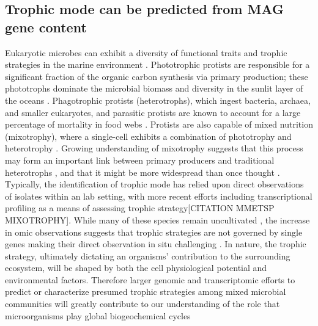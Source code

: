 \documentclass[12pt]{article}
\numberwithin{equation}{section}
\begin{document}
\subsection*{Trophic mode can be predicted from MAG gene content}

Eukaryotic microbes can exhibit a diversity of functional traits and trophic strategies in the marine environment \citep{Worden2015} \citep{Caron2011Marine}. Phototrophic protists are responsible for a significant fraction of the organic carbon synthesis via primary production; these phototrophs dominate the microbial biomass and diversity in the sunlit layer of the oceans \citep{Worden2015,de_Vargas_2015}. Phagotrophic protists (heterotrophs), which ingest bacteria, archaea, and smaller eukaryotes, and parasitic protists are known to account for a large percentage of mortality in food webs \citep{Sherr_2002, Caron2011Marine, Worden2015}. Protists are also capable of mixed nutrition (mixotrophy), where a single-cell exhibits a combination of phototrophy and heterotrophy \citep{Stoecker_2017}. Growing understanding of mixotrophy suggests that this process may form an important link between primary producers and traditional heterotrophs \citep{domaizon2003taxon}, and that it might be more widespread than once thought \citep{Worden2015}. Typically, the identification of trophic mode has relied upon direct observations of isolates within an lab setting, with more recent efforts including transcriptional profiling as a means of assessing trophic strategy[CITATION MMETSP MIXOTROPHY].  While many of these species remain uncultivated \citep{Worden2015}, the increase in omic observations suggests that trophic strategies are not governed by single genes making their direct observation in situ challenging \citep{Labarre_2020}. In nature, the trophic strategy, ultimately dictating an organisms' contribution to the surrounding ecosystem, will be shaped by both the cell physiological potential and environmental factors. Therefore larger genomic and transcriptomic efforts to predict or characterize presumed trophic strategies among mixed microbial communities will greatly contribute to our understanding of the role that microorganisms play global biogeochemical cycles %
\end{document}
